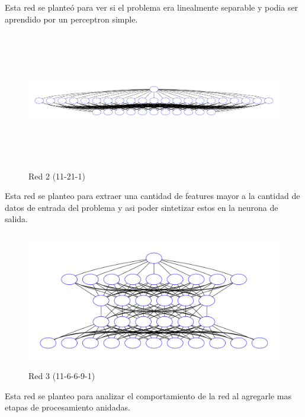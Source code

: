 Esta red se planteó para ver si el problema era linealmente separable y podia ser aprendido por un perceptron simple.

\begin{figure}[H]
  \includegraphics[width=12cm, height=6cm]{../plot/11-21-1.pdf}
  \centering
  \caption{Red 2 (11-21-1)}
\end{figure}

Esta red se planteo para extraer una cantidad de features mayor a la cantidad de datos de entrada del problema y asi poder sintetizar estos en la neurona de salida.

\begin{figure}[H]
  \includegraphics[width=12cm, height=6cm]{../plot/11-6-6-9-1.pdf}
  \centering
  \caption{Red 3 (11-6-6-9-1)}
\end{figure}

Esta red se planteo para analizar el comportamiento de la red al agregarle mas etapas de procesamiento anidadas.

